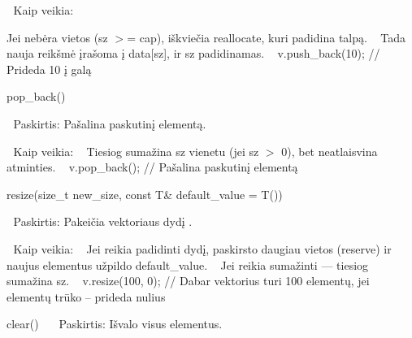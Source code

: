 🔹 Kaip veikia\+: ~\newline


Jei nebėra vietos (sz \texorpdfstring{$>$}{>}= cap), iškviečia reallocate, kuri padidina talpą. ~\newline
 Tada nauja reikšmė įrašoma į data\mbox{[}sz\mbox{]}, ir sz padidinamas. ~\newline
 v.\+push\+\_\+back(10); // Prideda 10 į galą ~\newline



\begin{DoxyEnumerate}
\item pop\+\_\+back() ~\newline

\end{DoxyEnumerate}

🔹 Paskirtis\+: Pašalina paskutinį elementą. ~\newline


🔹 Kaip veikia\+: ~\newline
 Tiesiog sumažina sz vienetu (jei sz \texorpdfstring{$>$}{>} 0), bet neatlaisvina atminties. ~\newline
 v.\+pop\+\_\+back(); // Pašalina paskutinį elementą ~\newline



\begin{DoxyEnumerate}
\item resize(size\+\_\+t new\+\_\+size, const T\& default\+\_\+value = T()) ~\newline

\end{DoxyEnumerate}

🔹 Paskirtis\+: Pakeičia vektoriaus dydį .

🔹 Kaip veikia\+: ~\newline
 Jei reikia padidinti dydį, paskirsto daugiau vietos (reserve) ir naujus elementus užpildo default\+\_\+value. ~\newline
 Jei reikia sumažinti — tiesiog sumažina sz. ~\newline
 v.\+resize(100, 0); // Dabar vektorius turi 100 elementų, jei elementų trūko – prideda nulius ~\newline



\begin{DoxyEnumerate}
\item clear() ~\newline
 🔹 Paskirtis\+: Išvalo visus elementus.
\end{DoxyEnumerate}

